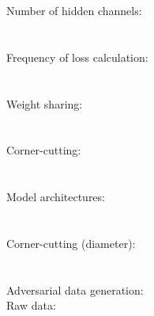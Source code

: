 \documentclass{article}
\begin{document}
Number of hidden channels:\\
\\\\

Frequency of loss calculation:\\
\\\\

Weight sharing:\\
\\\\

Corner-cutting:\\
\\\\

Model architectures:\\
\\\\

Corner-cutting (diameter):\\
\\\\

Adversarial data generation:\\


Raw data:\\

\end{document}
